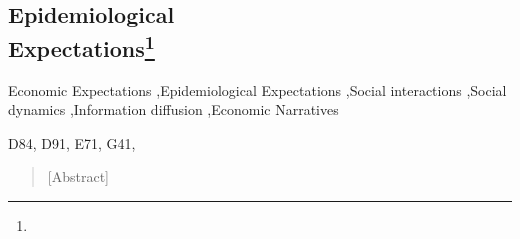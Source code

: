 \begin{frontmatter}%

  \chapter[Chapter Title]{Epidemiological \\ Expectations\footnote{\thankstext}}\label{chap1}


  \author[1]{Christopher Carroll}
  \author[1]{Tao Wang}
  \address[1]{, , \\ Corresponding: }



  \minitoc

  \makechaptertitle
  \begin{keywords}[Keywords:]
    Economic Expectations \sep Epidemiological Expectations \sep Social interactions \sep Social dynamics \sep Information diffusion \sep Economic Narratives
  \end{keywords}
  \begin{keywords}
    D84, D91, E71, G41,
  \end{keywords}
  \hypertarget{abstract}{}
  \begin{abstract}[Abstract]
    
  \end{abstract}
  \pagebreak
  
  
  
  \titlepagefinish
  \small
  \renewcommand{\listtablename}{\normalsize Tables}
  \renewcommand{\listfigurename}{\normalsize Figures}
  \listoffigures
  \medskip\medskip
  \listoftables
  \normalsize

  
  
  
  
\end{frontmatter}%
